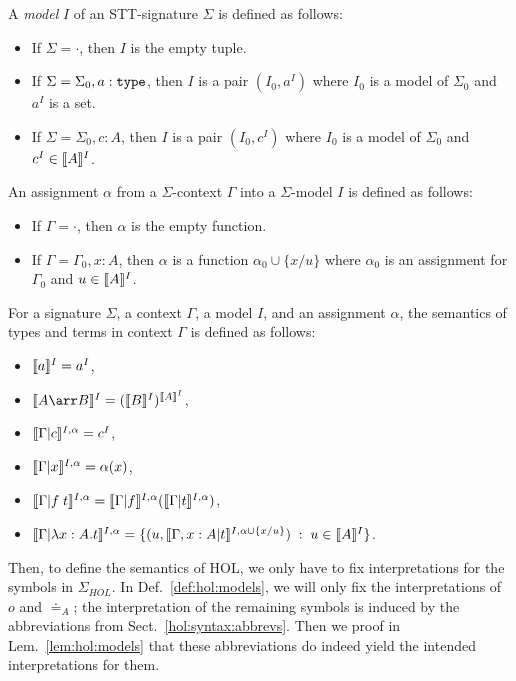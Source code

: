 \begin{definition}
A \emph{model} $I$ of an STT-signature $\Sigma$ is defined as follows:
\begin{itemize}
	\item If $\Sigma=\cdot$, then $I$ is the empty tuple.
	\item If $\Sigma=\Sigma_0,a:\mathtt{type}$, then $I$ is a pair $(I_0,a^I)$ where $I_0$ is a model of $\Sigma_0$ and $a^I$ is a set.
	\item If $\Sigma=\Sigma_0,c:A$, then $I$ is a pair $(I_0,c^I)$ where $I_0$ is a model of $\Sigma_0$ and $c^I\in \llbracket A\rrbracket^{I}$.
\end{itemize}

An assignment $\alpha$ from a $\Sigma$-context $\Gamma$ into a $\Sigma$-model $I$ is defined as follows:
\begin{itemize}
	\item If $\Gamma=\cdot$, then $\alpha$ is the empty function.
	\item If $\Gamma=\Gamma_0,x:A$, then $\alpha$ is a function $\alpha_0 \cup\{x/u\}$ where $\alpha_0$ is an assignment for $\Gamma_0$ and $u\in \llbracket A\rrbracket^{I}$.
\end{itemize}

For a signature $\Sigma$, a context $\Gamma$, a model $I$, and an assignment $\alpha$, the semantics of types and terms in context $\Gamma$ is defined as follows:
\begin{itemize}
	\item $\llbracket a\rrbracket^{I}=a^I$,
	\item $\semm{A\arr B}{I}=(\semm{B}{I})^{\semm{A}{I}}$,
	\item $\llbracket \Gamma|c\rrbracket^{I,\alpha}=c^I$,
	\item $\llbracket \Gamma|x\rrbracket^{I,\alpha}=\alpha(x)$,
	\item $\llbracket \Gamma|f\;t\rrbracket^{I,\alpha}= \llbracket \Gamma|f\rrbracket^{I,\alpha}(\llbracket \Gamma|t\rrbracket^{I,\alpha})$,
	\item $\llbracket \Gamma|\lambda x:A.t\rrbracket^{I,\alpha}= \{(u,\llbracket \Gamma,x:A|t\rrbracket^{I,\alpha\cup\{x/u\}}) \;:\; u\in \llbracket A\rrbracket^{I}\}$.
\end{itemize}
\end{definition}


Then, to define the semantics of HOL, we only have to fix interpretations for the symbols in $\Sigma_{HOL}$. In Def.~\ref{def:hol:models}, we will only fix the interpretations of $o$ and $\doteq_A$; the interpretation of the remaining symbols is induced by the abbreviations from Sect.~\ref{hol:syntax:abbrevs}. Then we proof in Lem.~\ref{lem:hol:models} that these abbreviations do indeed yield the intended interpretations for them.

